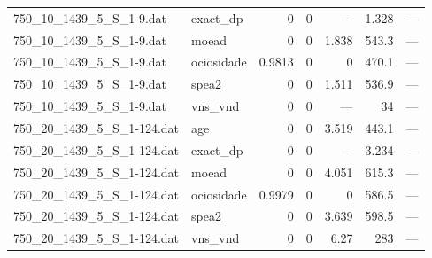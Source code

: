 \begin{tabular}{llrrrrr}
750\_10\_1439\_5\_S\_1-9.dat & exact\_dp & 0 & 0 & — & 1.328 & — \\
750\_10\_1439\_5\_S\_1-9.dat & moead & 0 & 0 & 1.838 & 543.3 & — \\
750\_10\_1439\_5\_S\_1-9.dat & ociosidade & 0.9813 & 0 & 0 & 470.1 & — \\
750\_10\_1439\_5\_S\_1-9.dat & spea2 & 0 & 0 & 1.511 & 536.9 & — \\
750\_10\_1439\_5\_S\_1-9.dat & vns\_vnd & 0 & 0 & — & 34 & — \\
750\_20\_1439\_5\_S\_1-124.dat & age & 0 & 0 & 3.519 & 443.1 & — \\
750\_20\_1439\_5\_S\_1-124.dat & exact\_dp & 0 & 0 & — & 3.234 & — \\
750\_20\_1439\_5\_S\_1-124.dat & moead & 0 & 0 & 4.051 & 615.3 & — \\
750\_20\_1439\_5\_S\_1-124.dat & ociosidade & 0.9979 & 0 & 0 & 586.5 & — \\
750\_20\_1439\_5\_S\_1-124.dat & spea2 & 0 & 0 & 3.639 & 598.5 & — \\
750\_20\_1439\_5\_S\_1-124.dat & vns\_vnd & 0 & 0 & 6.27 & 283 & — \\
\hline
\end{tabular}
